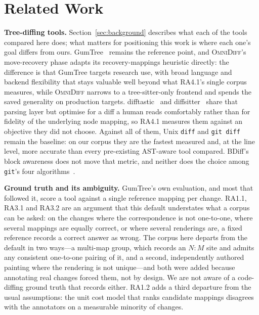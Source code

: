 \documentclass[sigconf]{acmart}
\begin{document}
\section{Related Work}
\label{sec:related}

\textbf{Tree-diffing tools.} Section~\ref{sec:background} describes what each of the tools
compared here does; what matters for positioning this work is where each one's goal differs from
ours. GumTree~\cite{gumtreediff-2014} remains the reference point, and \textsc{OmniDiff}'s
move-recovery phase adapts its recovery-mappings heuristic directly: the difference is that GumTree
targets research use, with broad language and backend flexibility that stays valuable well beyond
what RA4.1's single corpus measures, while \textsc{OmniDiff} narrows to a tree-sitter-only frontend
and spends the saved generality on production targets. difftastic~\cite{difftastic} and
diffsitter~\cite{diffsitter} share that parsing layer but optimise for a diff a human reads
comfortably rather than for fidelity of the underlying node mapping, so RA4.1 measures them against
an objective they did not choose. Against all of them, Unix \texttt{diff} and \texttt{git
diff}~\cite{myers-1986} remain the baseline: on our corpus they are the fastest measured and, at
the line level, more accurate than every pre-existing AST-aware tool compared. BDiff's~\cite{bdiff}
block awareness does not move that metric, and neither does the choice among \texttt{git}'s four
algorithms~\cite{nugroho-histogram}.

\textbf{Ground truth and its ambiguity.} GumTree's own evaluation, and most that followed it,
score a tool against a single reference mapping per change. RA1.1, RA3.1 and RA3.2 are an argument
that this default understates what a corpus can be asked: on the changes where the correspondence
is not one-to-one, where several mappings are equally correct, or where several renderings are, a
fixed reference records a correct answer as wrong. The corpus here departs from the default in two
ways---a multi-map group, which records an $N{:}M$ site and admits any consistent one-to-one
pairing of it, and a second, independently authored painting where the rendering is not
unique---and both were added because annotating real changes forced them, not by design. We are
not aware of a code-diffing ground truth that records either. RA1.2 adds a third departure from
the usual assumptions: the unit cost model that ranks candidate mappings disagrees with the
annotators on a measurable minority of changes.
\end{document}
